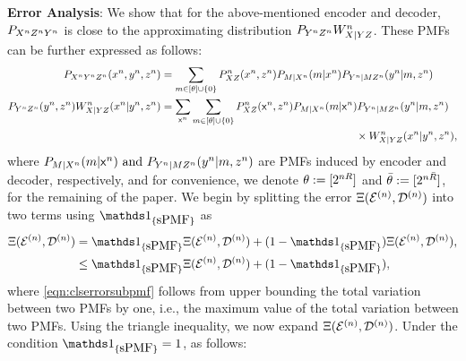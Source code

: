 \vspace{3pt}
\noindent \textbf{Error Analysis}: 
We show that for the above-mentioned encoder and decoder, $P_{X^nZ^nY^n}$ is close to the approximating distribution $P_{Y^nZ^n} W^n_{X|YZ}$. These PMFs can be further expressed as follows:
\begin{align*}
    P_{X^nY^nZ^n}(x^n,y^n,z^n) &= \sum_{m \in [\theta] \cup \{0\}} P_{XZ}^n(x^n,z^n) P_{M|X^n}(m|x^n)P_{Y^n|MZ^n}(y^n|m,z^n)\\
    P_{Y^nZ^n}(y^n,z^n) W^n_{X|YZ}(x^n
|y^n,z^n) &= \sum_{\mathsf{x}^n}\sum_{\substack{m \in [\theta] \cup \{0\}}}  P^n_{XZ}(\mathsf{x}^n,z^n)P_{M|X^n}(m|\mathsf{x}^n) P_{Y^n|MZ^n}(y^n|m,z^n)\\
& \hspace{2.5in}\times W^n_{X|YZ}(x^n
|y^n,z^n),
\end{align*}
where $P_{M|X^n}(m|\mathsf{x}^n) \text{ and } P_{Y^n|MZ^n}(y^n|m,z^n)$ are PMFs induced by encoder and decoder, respectively, and for convenience, we denote $\theta := [2^{nR}]$ and  $\bar{\theta} := [2^{n\bar{R}}]$, for the remaining of the paper. We begin by splitting the error $ \Xi(\mathcal{E}^{(n)},\mathcal{D}^{(n)})$ into two terms using $\Ipmf$ as 
\begin{align}
    \Xi(\encodern,\decodern) 
    &= \Ipmf 
\Xi(\encodern,\decodern) + (1- \Ipmf)\Xi(\encodern,\decodern),\nonumber \\
&\leq \Ipmf 
\Xi(\encodern,\decodern) + ({1- \Ipmf}),\label{eqn:clserrorsubpmf}
\end{align}
where \eqref{eqn:clserrorsubpmf} follows from upper bounding the total variation between two PMFs by one, i.e., the maximum value of the 
total variation between two PMFs. 
Using the triangle inequality, we now expand $\Xi(\mathcal{E}^{(n)},\mathcal{D}^{(n)})$. Under the condition $\Ipmf = 1$, as follows:

